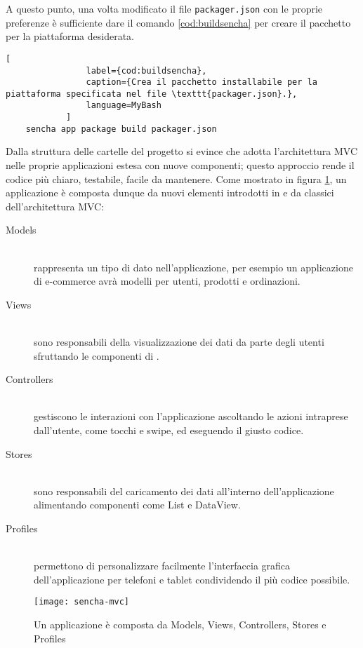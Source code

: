 			A questo punto, una volta modificato il file \verb|packager.json| con
			le proprie preferenze è sufficiente dare il comando \ref{cod:buildsencha}
			per creare il pacchetto per la piattaforma desiderata.
			\begin{lstlisting}[
				label={cod:buildsencha},
				caption={Crea il pacchetto installabile per la piattaforma specificata nel file \texttt{packager.json}.},
				language=MyBash
			]
	sencha app package build packager.json
			\end{lstlisting}
			
			Dalla struttura delle cartelle del progetto si evince che \senchat{} adotta
			l'architettura MVC nelle proprie applicazioni estesa con nuove componenti;
			questo approccio rende il codice più chiaro, testabile, facile da mantenere.
			Come mostrato in figura	\ref{fig:sencha_mvc}, un applicazione è
			composta dunque da nuovi elementi introdotti in \senchat{} e da
			classici dell'architettura MVC:
			\begin{description}
				\item[Models]\hfill \\
					rappresenta un tipo di dato nell'applicazione, per esempio un
					applicazione di e-commerce avrà modelli per utenti, prodotti
					e ordinazioni.
				\item[Views]\hfill \\
					sono responsabili della visualizzazione dei dati da parte
					degli utenti sfruttando le componenti di \senchat{}.
				\item[Controllers]\hfill \\
					gestiscono le interazioni con l'applicazione ascoltando le
					azioni intraprese dall'utente, come tocchi e swipe, ed eseguendo
					il giusto codice.
				\item[Stores]\hfill \\
					sono responsabili del caricamento dei dati all'interno
					dell'applicazione alimentando componenti come List e DataView.
				\item[Profiles]\hfill \\
					permettono di personalizzare facilmente l'interfaccia grafica
					dell'applicazione per telefoni e tablet condividendo il più
					codice possibile.
			\end{description}
			\begin{figure}[h]
				\centering
				\texttt{[image: sencha-mvc]}
				\caption{
					Un applicazione \senchat{} è composta da Models, Views,
					Controllers, Stores e Profiles
				}
				\label{fig:sencha_mvc}
			\end{figure}
			
